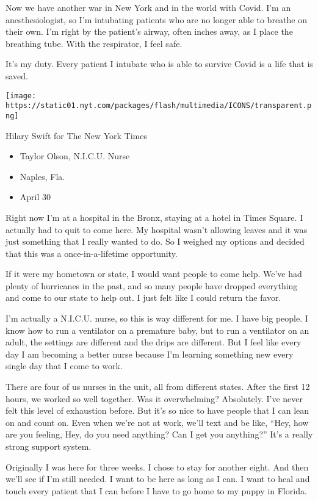 Now we have another war in New York and in the world with Covid. I'm an
anesthesiologist, so I'm intubating patients who are no longer able to
breathe on their own. I'm right by the patient's airway, often inches
away, as I place the breathing tube. With the respirator, I feel safe.

It's my duty. Every patient I intubate who is able to survive Covid is a
life that is saved.

\texttt{[image: https://static01.nyt.com/packages/flash/multimedia/ICONS/transparent.png]}

Hilary Swift for The New York Times

\begin{itemize}
\tightlist
\item
  Taylor Olson, N.I.C.U. Nurse
\item
  Naples, Fla.
\item
  April 30
\end{itemize}

Right now I'm at a hospital in the Bronx, staying at a hotel in Times
Square. I actually had to quit to come here. My hospital wasn't allowing
leaves and it was just something that I really wanted to do. So I
weighed my options and decided that this was a once-in-a-lifetime
opportunity.

If it were my hometown or state, I would want people to come help. We've
had plenty of hurricanes in the past, and so many people have dropped
everything and come to our state to help out. I just felt like I could
return the favor.

I'm actually a N.I.C.U. nurse, so this is way different for me. I have
big people. I know how to run a ventilator on a premature baby, but to
run a ventilator on an adult, the settings are different and the drips
are different. But I feel like every day I am becoming a better nurse
because I'm learning something new every single day that I come to work.

There are four of us nurses in the unit, all from different states.
After the first 12 hours, we worked so well together. Was it
overwhelming? Absolutely. I've never felt this level of exhaustion
before. But it's so nice to have people that I can lean on and count on.
Even when we're not at work, we'll text and be like, ``Hey, how are you
feeling, Hey, do you need anything? Can I get you anything?'' It's a
really strong support system.

Originally I was here for three weeks. I chose to stay for another
eight. And then we'll see if I'm still needed. I want to be here as long
as I can. I want to heal and touch every patient that I can before I
have to go home to my puppy in Florida.

